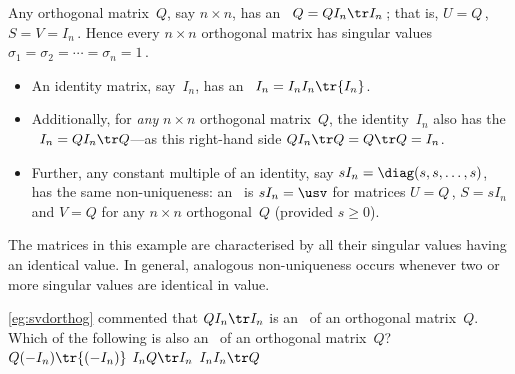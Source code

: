 \begin{example} \label{eg:svdorthog}
Any orthogonal matrix~\(Q\), say \(n\times n\), has an \svd\ \(Q=QI_n\tr I_n\)\,; that is, \(U=Q\)\,, \(S=V=I_n\)\,. 
Hence every \(n\times n\) orthogonal matrix has singular values \(\sigma_1=\sigma_2=\cdots=\sigma_n=1\)\,.
\end{example}


\begin{example} \label{eg:svdnonuniq}
\begin{itemize}
\item An identity matrix, say~\(I_n\), has an \svd\ \(I_n=I_nI_n\tr{I_n}\).  
\item Additionally, for \emph{any} \(n\times n\) orthogonal matrix~\(Q\), the identity~\(I_n\) also has the \svd\ \(I_n=QI_n\tr Q\)---as this right-hand side \(QI_n\tr Q=Q\tr Q=I_n\).
\item Further, any constant multiple of an identity, say \(sI_n=\diag(s,s,\ldots,s)\), has the same non-uniqueness: an \svd\ is \(sI_n=\usv\) for matrices \(U=Q\)\,, \(S=sI_n\) and \(V=Q\) for any \(n\times n\) orthogonal~\(Q\) (provided \(s\geq0\)).
\end{itemize}
The matrices in this example are characterised by all their singular values having an identical value. 
In general, analogous non-uniqueness occurs whenever two or more singular values are identical in value.
\end{example}




\begin{activity}
\autoref{eg:svdorthog} commented that \(QI_n\tr I_n\) is an \svd\ of an orthogonal matrix~\(Q\).  
Which of the following is also an \svd\ of an orthogonal matrix~\(Q\)?
{\(Q(-I_n)\tr{(-I_n)}\)}
{\(I_nQ\tr I_n\)}
{\(I_nI_n\tr Q\)}
\end{activity}





